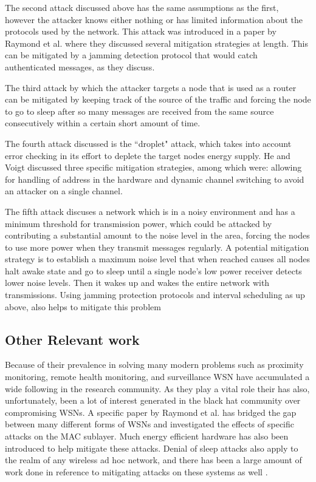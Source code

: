 The second attack discussed above has the same assumptions as the first, however the attacker knows either nothing or has limited information about the protocols used by the network. This attack was introduced in a paper by
Raymond et al. where they discussed several mitigation strategies at length\cite{4476299}. This can be mitigated by a jamming detection protocol that would catch authenticated messages, as they discuss. 

The third attack by which the attacker targets a node that is used as a router can be mitigated by keeping track of the source of the traffic and forcing the node to go to sleep after so many messages are received from the same
source consecutively within a certain short amount of time. 

The fourth attack discussed is the ``droplet" attack, which takes into account error checking in its effort to deplete the target nodes energy supply. He and Voigt discussed three specific mitigation strategies, among which were:
 allowing for handling of address in the hardware and dynamic channel switching to avoid an attacker on a single channel.

The fifth attack discuses a network which is in a noisy environment and has a minimum threshold for transmission power, which could be attacked by contributing a substantial amount to the noise level in the area, forcing the nodes
to use more power when they transmit messages regularly. A potential mitigation strategy is to establish a maximum noise level that when reached causes all nodes halt awake state and go to sleep until a single node's low power receiver detects lower noise levels.
Then it wakes up and wakes the entire network with transmissions. Using jamming protection protocols and interval scheduling as up above, also helps to mitigate this problem\cite{4476299}
 
\subsection{Other Relevant work}

Because of their prevalence in solving many modern problems such as proximity monitoring, remote health monitoring\cite{4561146}, and surveillance WSN have accumulated a wide following in the research community. As they play a vital role their has also, unfortunately, been a lot of interest generated in the black hat community over compromising WSNs. A specific paper by Raymond et al. has bridged the gap between many different forms of WSNs and investigated the effects of specific attacks on the MAC sublayer\cite{4476299}. Much energy efficient hardware has also been introduced to help mitigate these attacks\cite{6558065}. Denial of sleep attacks also apply to the realm of any wireless ad hoc network, and there has been a large amount of work done in reference to mitigating attacks on these systems as well \cite{6112758}.

